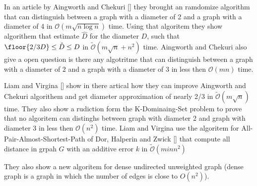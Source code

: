 In an article by Aingworth and Chekuri [] they brought an ramdomize algorithm that can distinguish between a graph with a diameter of 2 and a graph with a diameter of 4 in $\mathcal{O}(m \sqrt{n\log n})$ time. Using that algoritem they show algorithem that estimate $\hat{D}$ for the diameter $D$, such that $\floor{2/3D} \leq \hat{D} \leq D$ in $\mathcal{\tilde{O}}(m\sqrt{n}+n^2)$ time. Aingworth and Chekuri also give a open question is there any algotritme that can distinguish between a graph with a diameter of 2 and a graph with a diameter of 3 in less then $\mathcal{O}(mn)$ time.

Liam and Virgina [] show in there artical how they can improve Aingworth and Chekuri algorithem and get diameter approximation of nearly 2/3 in $\mathcal{\tilde{O}}(m\sqrt{n})$ time.
They also show a rudiction form the K-Dominaing-Set problem to prove that no algoritem can distinghs between graph with diameter 2 and graph with diameter 3 in less then $\mathcal{O}(n^2)$ time.
Liam and Virgina use the algoritem for All-Pair-Almost-Shortest-Path of Dor, Halperin and Zwick [] that compute all distance in grpah $G$ with an additive error $k$ in $\mathcal{\tilde{O}}(min{n^2})$

They also show a new algoritem for dense undirected unweighted graph (dense graph is a graph in which the number of edges is close to $O(n^2)$).    